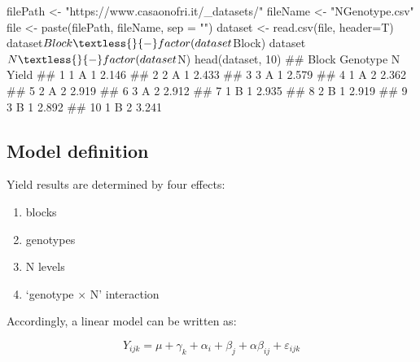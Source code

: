 \documentclass[a4paper,12pt,oneside]{book}
\providecommand{\tightlist}{%
  \setlength{\itemsep}{0pt}\setlength{\parskip}{0pt}}
\newenvironment{Shaded}{\begin{snugshade}}{\end{snugshade}}
\newcommand{\DecValTok}[1]{#1}
\newcommand{\SpecialCharTok}[1]{#1}
\newcommand{\StringTok}[1]{#1}
\newcommand{\DocumentationTok}[1]{#1}
\newcommand{\OtherTok}[1]{#1}
\newcommand{\FunctionTok}[1]{#1}
\newcommand{\AttributeTok}[1]{#1}
\newcommand{\NormalTok}[1]{#1}
\begin{document}
\begin{Shaded}
\begin{Highlighting}[]
\NormalTok{filePath }\OtherTok{\textless{}{-}} \StringTok{"https://www.casaonofri.it/\_datasets/"}
\NormalTok{fileName }\OtherTok{\textless{}{-}} \StringTok{"NGenotype.csv"}
\NormalTok{file }\OtherTok{\textless{}{-}} \FunctionTok{paste}\NormalTok{(filePath, fileName, }\AttributeTok{sep =} \StringTok{""}\NormalTok{)}
\NormalTok{dataset }\OtherTok{\textless{}{-}} \FunctionTok{read.csv}\NormalTok{(file, }\AttributeTok{header=}\NormalTok{T)}
\NormalTok{dataset}\SpecialCharTok{$}\NormalTok{Block }\OtherTok{\textless{}{-}} \FunctionTok{factor}\NormalTok{(dataset}\SpecialCharTok{$}\NormalTok{Block)}
\NormalTok{dataset}\SpecialCharTok{$}\NormalTok{N }\OtherTok{\textless{}{-}} \FunctionTok{factor}\NormalTok{(dataset}\SpecialCharTok{$}\NormalTok{N)}
\FunctionTok{head}\NormalTok{(dataset, }\DecValTok{10}\NormalTok{)}
\DocumentationTok{\#\#    Block Genotype N Yield}
\DocumentationTok{\#\# 1      1        A 1 2.146}
\DocumentationTok{\#\# 2      2        A 1 2.433}
\DocumentationTok{\#\# 3      3        A 1 2.579}
\DocumentationTok{\#\# 4      1        A 2 2.362}
\DocumentationTok{\#\# 5      2        A 2 2.919}
\DocumentationTok{\#\# 6      3        A 2 2.912}
\DocumentationTok{\#\# 7      1        B 1 2.935}
\DocumentationTok{\#\# 8      2        B 1 2.919}
\DocumentationTok{\#\# 9      3        B 1 2.892}
\DocumentationTok{\#\# 10     1        B 2 3.241}
\end{Highlighting}
\end{Shaded}

\hypertarget{model-definition-2}{%
\subsection{Model definition}\label{model-definition-2}}

Yield results are determined by four effects:

\begin{enumerate}
\def\labelenumi{\arabic{enumi}.}
\tightlist
\item
  blocks
\item
  genotypes
\item
  N levels
\item
  `genotype \(\times\) N' interaction
\end{enumerate}

Accordingly, a linear model can be written as:

\[Y_{ijk} = \mu + \gamma_k + \alpha_i + \beta_j + \alpha\beta_{ij} + \varepsilon_{ijk}\]
\end{document}
